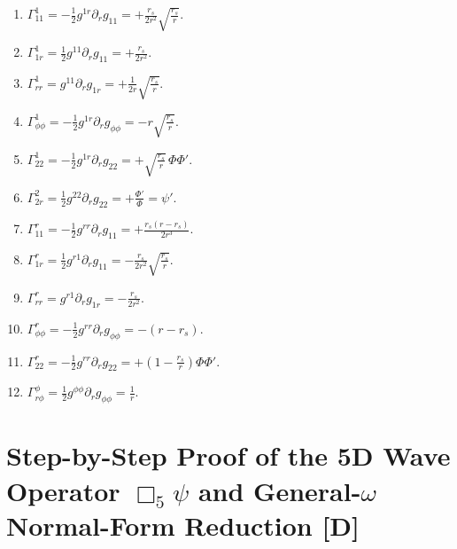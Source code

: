 \documentclass[11pt,a4paper]{article}
\newcommand{\catD}{\textbf{\textcolor{blue!75!black}{[D]}}}
\theoremstyle{definition}
\theoremstyle{remark}
\begin{document}
\begin{enumerate}
  \item $\Gamma^1_{11} = -\frac{1}{2}g^{1r}\partial_r g_{11} = +\frac{r_s}{2r^2}\sqrt{\frac{r_s}{r}}$.
  \item $\Gamma^1_{1r} = \frac{1}{2}g^{11}\partial_r g_{11} = +\frac{r_s}{2r^2}$.
  \item $\Gamma^1_{rr} = g^{11}\partial_r g_{1r} = +\frac{1}{2r}\sqrt{\frac{r_s}{r}}$.
  \item $\Gamma^1_{\phi\phi} = -\frac{1}{2}g^{1r}\partial_r g_{\phi\phi} = -r\sqrt{\frac{r_s}{r}}$.
  \item $\Gamma^1_{22} = -\frac{1}{2}g^{1r}\partial_r g_{22} = +\sqrt{\frac{r_s}{r}}\,\Phi\Phi'$.
  \item $\Gamma^2_{2r} = \frac{1}{2}g^{22}\partial_r g_{22} = +\frac{\Phi'}{\Phi} = \psi'$.
  \item $\Gamma^r_{11} = -\frac{1}{2}g^{rr}\partial_r g_{11} = +\frac{r_s(r - r_s)}{2r^3}$.
  \item $\Gamma^r_{1r} = \frac{1}{2}g^{r1}\partial_r g_{11} = -\frac{r_s}{2r^2}\sqrt{\frac{r_s}{r}}$.
  \item $\Gamma^r_{rr} = g^{r1}\partial_r g_{1r} = -\frac{r_s}{2r^2}$.
  \item $\Gamma^r_{\phi\phi} = -\frac{1}{2}g^{rr}\partial_r g_{\phi\phi} = -(r - r_s)$.
  \item $\Gamma^r_{22} = -\frac{1}{2}g^{rr}\partial_r g_{22} = +\left(1 - \frac{r_s}{r}\right)\Phi\Phi'$.
  \item $\Gamma^{\phi}_{r\phi} = \frac{1}{2}g^{\phi\phi}\partial_r g_{\phi\phi} = \frac{1}{r}$.
\end{enumerate}

\section{\texorpdfstring{Step-by-Step Proof of the 5D Wave Operator $\Box_5\psi$ and General-$\omega$ Normal-Form Reduction \catD}{Step-by-Step Proof of the 5D Wave Operator and General-omega Normal-Form Reduction}}
\label{app:laplace_beltrami_proof}
\end{document}
